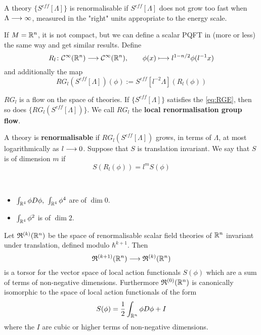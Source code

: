 \begin{principle}
  A theory $\{S^{eff}[\Lambda]\}$ is renormalisable if $S^{eff}[\Lambda]$ does not grow too fast when $\Lambda \longrightarrow \infty$, measured in the "right" units appropriate to the energy scale.
\end{principle}

If $M = \mathbb{R}^n$, it is not compact, but we can define a scalar PQFT in (more or less) the same way and get similar results. Define
\begin{equation}
  R_l \colon \Ci(\RR^n) \lra \Ci(\RR^n), \quad \quad \phi(x) \lmap l^{1-n/2} \phi(l^{-1} x)
\end{equation}
and additionally the map
\begin{equation}
  RG_l (S^{eff}[\Lambda]) (\phi) := S^{eff}[l^{-2} \Lambda](R_l(\phi))
\end{equation}

\begin{lem}
  $RG_l$ is a flow on the space of theories. If $ \{S^{eff}[\Lambda]\}$ satisfies the \eqref{eq:RGE}, then so does $\{RG_l(S^{eff}[\Lambda])\}$. We call $RG_l$ the \textbf{local renormalisation group flow}.
\end{lem}


\begin{definition}
  A theory is \textbf{renormalisable} if $RG_l(S^{eff}[\Lambda])$ grows, in terms of $\Lambda$, at most logarithmically as $l \longrightarrow 0$. Suppose that $S$ is translation invariant. We say that $S$ is of dimension $m$ if
  \begin{equation}S(R_l(\phi)) = l^m S(\phi)\end{equation}
\end{definition}

\begin{example}~
  \begin{itemize}
    \item $\int_{\RR^4} \phi D \phi, \ \int_{\RR^4} \phi^4$ are of $\dim 0$.
    \item $\int_{\RR^4} \phi^2$ is of $\dim 2$.
  \end{itemize}
\end{example}

\begin{theo}
  Let $\mathfrak{R}^{(k)}(\mathbb{R}^n)$ be the space of renormalisable scalar field theories of $\mathbb{R}^n$ invariant under translation, defined modulo $\hbar^{k+1}$. Then
  \begin{equation} \mathfrak{R}^{(k+1)}(\mathbb{R}^n) \longrightarrow \mathfrak{R}^{(k)}(\mathbb{R}^n)\end{equation}
  is a torsor for the vector space of local action functionals $S(\phi)$ which are a sum of terms of non-negative dimensions. Furthermore $\mathfrak{R}^{(0)}(\mathbb{R}^n)$ is canonically isomorphic to the space of local action functionals of the form
  \begin{equation}S(\phi) = \frac{1}{2} \int_{\RR^n} \phi D \phi + I\end{equation}
  where the $I$ are cubic or higher terms of non-negative dimensions.
\end{theo}

